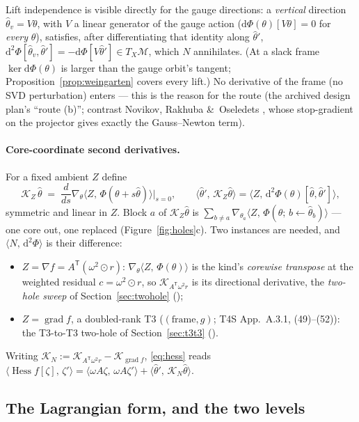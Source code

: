 \documentclass[11pt]{article}
\newcommand{\M}{\mathcal{M}}
\newcommand{\K}{\mathcal{K}}
\newcommand{\grad}{\operatorname{grad}}
\newcommand{\Hess}{\operatorname{Hess}}
\newcommand{\T}{\mathsf{T}}
\newcommand{\ip}[2]{\langle #1,\, #2\rangle}
\renewcommand{\th}{\theta}
\newcommand{\thh}{\hat\theta}
\theoremstyle{definition}
\theoremstyle{plain}
\begin{document}
Lift independence is visible directly for the gauge directions: a \emph{vertical} direction $\thh_v=V\th$, with $V$ a linear generator of
the gauge action ($\mathrm d\Phi(\th)[V\th]=0$ for \emph{every} $\th$), satisfies, after differentiating that identity along
$\thh'$, $\mathrm d^2\Phi[\thh_v,\thh']=-\mathrm d\Phi[V\thh']\in T_X\M$, which $N$ annihilates. (At a slack frame
$\ker \mathrm d\Phi(\th)$ is larger than the gauge orbit's tangent; Proposition~\ref{prop:weingarten} covers every lift.) No derivative of the frame (no SVD perturbation) enters --- this is the reason for the route
(the archived design plan's ``route (b)''; contrast Novikov, Rakhuba \&\ Oseledets \cite{NRO22}, whose
stop-gradient on the projector gives exactly the Gauss--Newton term).

\paragraph{Core-coordinate second derivatives.} For a fixed ambient $Z$ define
\begin{equation}
  \label{eq:Kdef}
  \K_Z\,\thh \;=\; \frac{d}{ds}\nabla_\th\ip{Z}{\Phi(\th+s\thh)}\Big|_{s=0},
  \qquad \ip{\thh'}{\K_Z\thh}=\ip{Z}{\mathrm d^2\Phi(\th)[\thh,\thh']},
\end{equation}
symmetric and linear in $Z$. Block $a$ of $\K_Z\thh$ is
$\sum_{b\neq a}\nabla_{\th_a}\ip{Z}{\Phi(\th;\,b\leftarrow\thh_b)}$ --- one core out, one replaced
(Figure~\ref{fig:holes}c). Two instances are needed, and $\ip{N}{\mathrm d^2\Phi}$ is their difference:
\begin{itemize}
  \item $Z=\nabla f=A^\T(\omega^2\odot r)$: $\nabla_\th\ip{Z}{\Phi(\th)}$ is the kind's \emph{corewise transpose}
    at the weighted residual $c=\omega^2\odot r$, so $\K_{A^\T\omega^2r}$ is its directional derivative, the
    \emph{two-hole sweep} of Section~\ref{sec:twohole} ();
  \item $Z=\grad f$, a doubled-rank T3 ($(\text{frame},g)$; T4S App.~A.3.1, (49)--(52)): the
    T3-to-T3 two-hole of Section~\ref{sec:t3t3} ().
\end{itemize}
Writing $\K_N := \K_{A^\T\omega^2r}-\K_{\grad f}$, \eqref{eq:hess} reads
$\ip{\Hess f[\zeta]}{\zeta'}=\ip{\omega A\zeta}{\omega A\zeta'}+\ip{\thh'}{\K_N\thh}$.

\subsection{The Lagrangian form, and the two levels}
\end{document}
